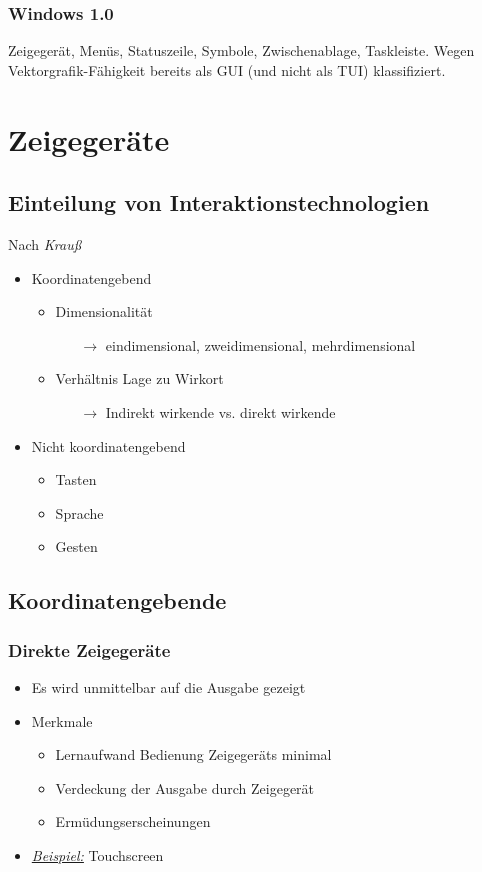 \documentclass[8pt,a4paper,landscape]{extarticle}
\newcommand{\example}{\textit{\underline{Beispiel:} }}
\begin{document}
\begin{multicols*}{4}
	\subsubsection*{Windows 1.0}
	Zeigegerät, Menüs, Statuszeile, Symbole, Zwischenablage, Taskleiste.
	Wegen Vektorgrafik-Fähigkeit bereits als GUI (und nicht als TUI)
	klassifiziert.
	\section{Zeigegeräte}
	\subsection{Einteilung von Interaktionstechnologien}
	Nach \emph{Krauß}
	\begin{itemize}[nolistsep]
		\item Koordinatengebend
		      \begin{itemize}[nolistsep]
			      \item Dimensionalität
			            \begin{itemize}[nolistsep]
				            \item[\(\rightarrow\)] eindimensional,
				                  zweidimensional, mehrdimensional
			            \end{itemize}
			      \item Verhältnis Lage zu Wirkort
			            \begin{itemize}[nolistsep]
				            \item[\(\rightarrow\)] Indirekt wirkende vs. direkt
				                  wirkende
			            \end{itemize}
		      \end{itemize}
		\item Nicht koordinatengebend
		      \begin{itemize}[nolistsep]
			      \item Tasten
			      \item Sprache
			      \item Gesten
		      \end{itemize}
	\end{itemize}
	\subsection{Koordinatengebende}
	\subsubsection{Direkte Zeigegeräte}
	\begin{itemize}
		\item Es wird unmittelbar auf die Ausgabe gezeigt
		\item Merkmale
		      \begin{itemize}[nolistsep]
			      \item Lernaufwand Bedienung Zeigegeräts minimal
			      \item Verdeckung der Ausgabe durch Zeigegerät
			      \item Ermüdungserscheinungen
		      \end{itemize}
		\item \example Touchscreen
	\end{itemize}

\end{multicols*}
\end{document}
